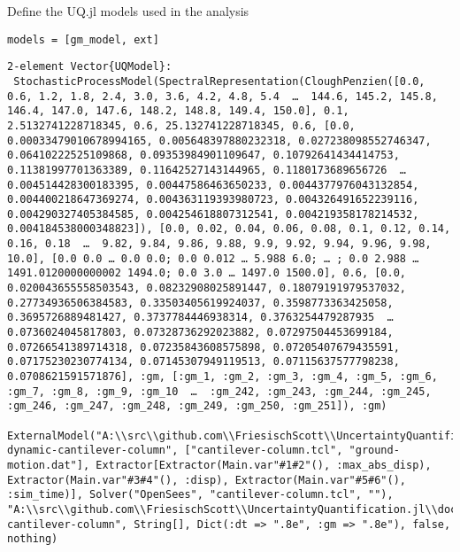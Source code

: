Define the UQ.jl models used in the analysis




\begin{verbatim}
models = [gm_model, ext]
\end{verbatim}


\begin{verbatim}
2-element Vector{UQModel}:
 StochasticProcessModel(SpectralRepresentation(CloughPenzien([0.0, 0.6, 1.2, 1.8, 2.4, 3.0, 3.6, 4.2, 4.8, 5.4  …  144.6, 145.2, 145.8, 146.4, 147.0, 147.6, 148.2, 148.8, 149.4, 150.0], 0.1, 2.5132741228718345, 0.6, 25.132741228718345, 0.6, [0.0, 0.00033479010678994165, 0.005648397880232318, 0.027238098552746347, 0.06410222525109868, 0.09353984901109647, 0.10792641434414753, 0.11381997701363389, 0.11642527143144965, 0.1180173689656726  …  0.004514428300183395, 0.00447586463650233, 0.0044377976043132854, 0.004400218647369274, 0.004363119393980723, 0.004326491652239116, 0.004290327405384585, 0.004254618807312541, 0.004219358178214532, 0.004184538000348823]), [0.0, 0.02, 0.04, 0.06, 0.08, 0.1, 0.12, 0.14, 0.16, 0.18  …  9.82, 9.84, 9.86, 9.88, 9.9, 9.92, 9.94, 9.96, 9.98, 10.0], [0.0 0.0 … 0.0 0.0; 0.0 0.012 … 5.988 6.0; … ; 0.0 2.988 … 1491.0120000000002 1494.0; 0.0 3.0 … 1497.0 1500.0], 0.6, [0.0, 0.020043655558503543, 0.08232908025891447, 0.18079191979537032, 0.27734936506384583, 0.33503405619924037, 0.3598773363425058, 0.3695726889481427, 0.3737784446938314, 0.3763254479287935  …  0.0736024045817803, 0.07328736292023882, 0.07297504453699184, 0.07266541389714318, 0.07235843608575898, 0.07205407679435591, 0.07175230230774134, 0.07145307949119513, 0.07115637577798238, 0.0708621591571876], :gm, [:gm_1, :gm_2, :gm_3, :gm_4, :gm_5, :gm_6, :gm_7, :gm_8, :gm_9, :gm_10  …  :gm_242, :gm_243, :gm_244, :gm_245, :gm_246, :gm_247, :gm_248, :gm_249, :gm_250, :gm_251]), :gm)
 ExternalModel("A:\\src\\github.com\\FriesischScott\\UncertaintyQuantification.jl\\docs\\build\\examples\\demo/models/opensees-dynamic-cantilever-column", ["cantilever-column.tcl", "ground-motion.dat"], Extractor[Extractor(Main.var"#1#2"(), :max_abs_disp), Extractor(Main.var"#3#4"(), :disp), Extractor(Main.var"#5#6"(), :sim_time)], Solver("OpenSees", "cantilever-column.tcl", ""), "A:\\src\\github.com\\FriesischScott\\UncertaintyQuantification.jl\\docs\\build\\examples\\workdir-cantilever-column", String[], Dict(:dt => ".8e", :gm => ".8e"), false, nothing)
\end{verbatim}



